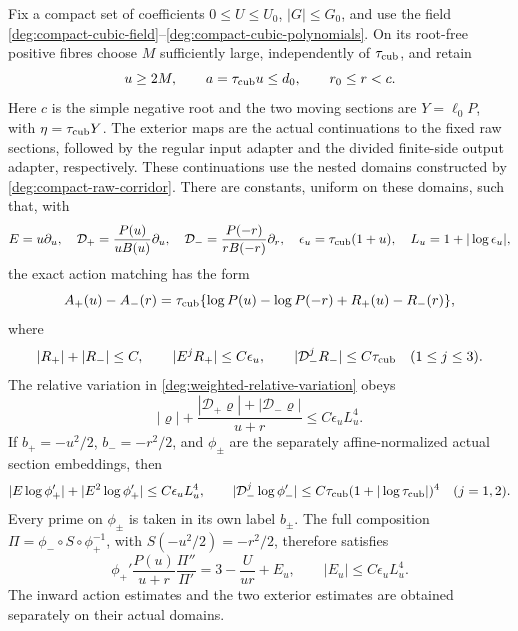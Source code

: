 \begin{lemma}
\label{deg:lem-weighted-cubic-tail}
Fix a compact set of coefficients \(0\le U\le U_0\),
\(|G|\le G_0\), and use the field
\eqref{deg:compact-cubic-field}--\eqref{deg:compact-cubic-polynomials}.
On its root-free positive fibres choose \(M\) sufficiently large,
independently of \(\tau_{\rm cub}\), and retain
\[
 u\ge2M,\qquad a=\tau_{\rm cub} u\le d_0,\qquad r_0\le r<c.
\]
Here \(c\) is the simple negative root and the two moving sections are
\(Y=\ell_0P\), with \(\eta=\tau_{\rm cub} Y\).  The exterior maps are the
actual continuations to the fixed raw sections, followed by the regular
input adapter and the divided finite-side output adapter, respectively.
These continuations use the nested domains constructed by
\eqref{deg:compact-raw-corridor}.
There are constants, uniform on these domains, such that, with
\[
 E=u\partial_u,\quad
 \mathcal D_+=\frac{P(u)}{uB(u)}\partial_u,\quad
 \mathcal D_-=\frac{P(-r)}{rB(-r)}\partial_r,\quad
 \epsilon_u=\tau_{\rm cub}(1+u),\quad L_u=1+|\log\epsilon_u|,
\]
the exact action matching has the form
\begin{equation}
 A_+(u)-A_-(r)=\tau_{\rm cub}\{\log P(u)-\log P(-r)+R_+(u)-R_-(r)\},
 \label{deg:weighted-split-action}
\end{equation}
where
\begin{equation}
 |R_+|+|R_-|\le C,\qquad
 |E^jR_+|\le C\epsilon_u,\qquad
 |\mathcal D_-^jR_-|\le C\tau_{\rm cub}\quad(1\le j\le3).
 \label{deg:weighted-action-jets}
\end{equation}
The relative variation in \eqref{deg:weighted-relative-variation} obeys
\begin{equation}
 |\varrho|+\frac{|\mathcal D_+\varrho|+|\mathcal D_-\varrho|}{u+r}
       \le C\epsilon_uL_u^4.
 \label{deg:compact-rho}
\end{equation}
If \(b_+=-u^2/2\),
\(b_-=-r^2/2\), and \(\phi_\pm\) are the separately affine-normalized
actual section embeddings, then
\begin{equation}
 |E\log\phi_+'|+|E^2\log\phi_+'|
       \le C\epsilon_uL_u^4,
 \qquad
 |\mathcal D_-^j\log\phi_-'|
       \le C\tau_{\rm cub}(1+|\log\tau_{\rm cub}|)^4\quad(j=1,2).
 \label{deg:weighted-actual-section-jets}
\end{equation}
Every prime on \(\phi_\pm\) is taken in its own label \(b_\pm\).
The full composition \(\Pi=\phi_-\circ S\circ\phi_+^{-1}\), with
\(S(-u^2/2)=-r^2/2\), therefore satisfies
\begin{equation}
 \phi_+'\frac{P(u)}{u+r}\frac{\Pi''}{\Pi'}
       =3-\frac{U}{ur}+E_u,
 \qquad |E_u|\le C\epsilon_uL_u^4.
 \label{deg:compact-curvature}
\end{equation}
The inward action estimates and the two exterior estimates are obtained
separately on their actual domains.
\end{lemma}

